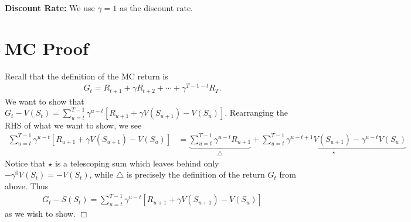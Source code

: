 \documentclass{article}
\begin{document}
\noindent\textbf{Discount Rate:} We use $\gamma = 1$ as the discount rate.

\section*{MC Proof}
Recall that the definition of the MC return is
\begin{align*}
	G_t = R_{t + 1} + \gamma R_{t + 2} + \cdots + \gamma^{T - 1 - t}R_T.
\end{align*}
We want to show that $G_t - V(S_t) = \sum_{u = t}^{T - 1}\gamma^{u - t}[R_{u + 1} + \gamma V(S_{u + 1}) - V(S_u)]$. Rearranging the RHS of what we want to show, we see
\begin{align*}
	\sum_{u = t}^{T - 1}\gamma^{u - t}[R_{u + 1} + \gamma V(S_{u + 1}) - V(S_u)] &= \underbrace{\sum_{u = t}^{T - 1}\gamma^{u - t}R_{u + 1}}_{\triangle} + \underbrace{\sum_{u = t}^{T - 1}\gamma^{u - t + 1}V(S_{u + 1}) - \gamma^{u - t}V(S_{u})}_{\star}
\end{align*}
Notice that $\star$ is a telescoping sum which leaves behind only $-\gamma^0V(S_t)= -V(S_t)$, while $\triangle$ is precisely the definition of the return $G_t$ from above. Thus
\begin{align*}
	G_t - S(S_t) = \sum_{u = t}^{T - 1}\gamma^{u - t}[R_{u + 1} + \gamma V(S_{u + 1}) - V(S_u)]
\end{align*}
as we wish to show. $\Box$
\end{document}
